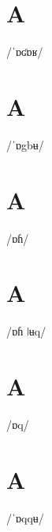 \documentclass[10pt,a4paper,twoside]{book}
\begin{document}
\section*{A}

\begin{multicols}{3}
 {/ˈɒʛɒʁ/} {}
\end{multicols}

\section*{A}

\begin{multicols}{3}
 {/ˈɒgbʉ/} {}
\end{multicols}

\section*{A}

\begin{multicols}{3}
 {/ɒɦ/} {}
\end{multicols}

\section*{A}

\begin{multicols}{3}
 {/ɒɦ ǀʉq/} {}
\end{multicols}

\section*{A}

\begin{multicols}{3}
 {/ɒq/} {}
\end{multicols}

\section*{A}

\begin{multicols}{3}
 {/ˈɒqqʉ/} {}
\end{multicols}
\end{document}
